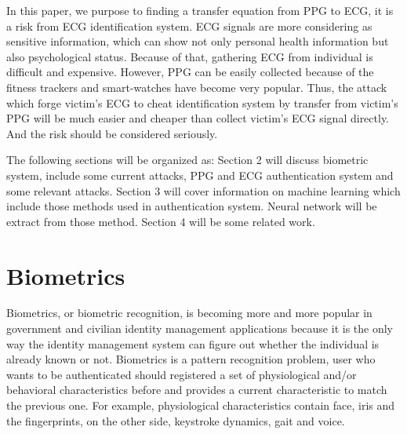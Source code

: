 \documentclass[a4paper,12pt]{article}
\begin{document}
In this paper, we purpose to finding a transfer equation from PPG to ECG, it is a risk from ECG identification system. ECG signals are more considering as sensitive information, which can show not only personal health information but also psychological status\parencite{Damousis:2008unobtrusive}. Because of that, gathering ECG from individual is difficult and expensive. However, PPG can be easily collected because of the fitness trackers and smart-watches have become very popular\parencite{Blasco:2018feasibility}. Thus, the attack which forge victim's ECG to cheat identification system by transfer from victim's PPG will be much easier and cheaper than collect victim's ECG signal directly. And the risk should be considered seriously. 

The following sections will be organized as: Section 2 will discuss biometric system, include some current attacks, PPG and ECG authentication system and some relevant attacks. Section 3 will cover information on machine learning which include those methods used in authentication system. Neural network will be extract from those method. Section 4 will be some related work.

\section{Biometrics}\label{Biometrics}
Biometrics, or biometric recognition, is becoming more and more popular in government and civilian identity management applications because it is the only way the identity management system can figure out whether the individual is already known or not\parencite{Jain:2011bio}. Biometrics is a pattern recognition problem, user who wants to be authenticated should registered a set of physiological and/or behavioral characteristics before and provides a current characteristic to match the previous one\parencite{Blasco:2018feasibility}. For example, physiological characteristics contain face, iris and the fingerprints, on the other side, keystroke dynamics, gait and voice\parencite{Agrafioti:2011heart}. 
\end{document}
